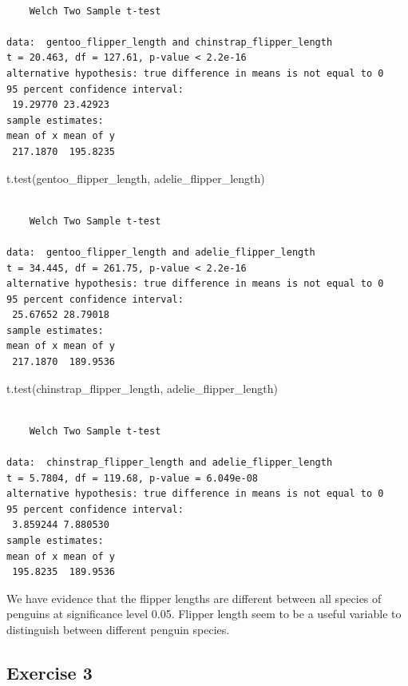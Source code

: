 \documentclass[
  letterpaper,
  DIV=11,
  numbers=noendperiod]{scrreprt}
\newenvironment{Shaded}{\begin{snugshade}}{\end{snugshade}}
\newcommand{\FunctionTok}[1]{\textcolor[rgb]{0.28,0.35,0.67}{#1}}
\newcommand{\NormalTok}[1]{\textcolor[rgb]{0.00,0.23,0.31}{#1}}
\begin{document}
\begin{verbatim}

    Welch Two Sample t-test

data:  gentoo_flipper_length and chinstrap_flipper_length
t = 20.463, df = 127.61, p-value < 2.2e-16
alternative hypothesis: true difference in means is not equal to 0
95 percent confidence interval:
 19.29770 23.42923
sample estimates:
mean of x mean of y 
 217.1870  195.8235 
\end{verbatim}

\begin{Shaded}
\begin{Highlighting}[]
\FunctionTok{t.test}\NormalTok{(gentoo\_flipper\_length, adelie\_flipper\_length)}
\end{Highlighting}
\end{Shaded}

\begin{verbatim}

    Welch Two Sample t-test

data:  gentoo_flipper_length and adelie_flipper_length
t = 34.445, df = 261.75, p-value < 2.2e-16
alternative hypothesis: true difference in means is not equal to 0
95 percent confidence interval:
 25.67652 28.79018
sample estimates:
mean of x mean of y 
 217.1870  189.9536 
\end{verbatim}

\begin{Shaded}
\begin{Highlighting}[]
\FunctionTok{t.test}\NormalTok{(chinstrap\_flipper\_length, adelie\_flipper\_length)}
\end{Highlighting}
\end{Shaded}

\begin{verbatim}

    Welch Two Sample t-test

data:  chinstrap_flipper_length and adelie_flipper_length
t = 5.7804, df = 119.68, p-value = 6.049e-08
alternative hypothesis: true difference in means is not equal to 0
95 percent confidence interval:
 3.859244 7.880530
sample estimates:
mean of x mean of y 
 195.8235  189.9536 
\end{verbatim}

We have evidence that the flipper lengths are different between all
species of penguins at significance level 0.05. Flipper length seem to
be a useful variable to distinguish between different penguin species.

\subsection{Exercise 3}\label{exercise-3-15}
\end{document}
